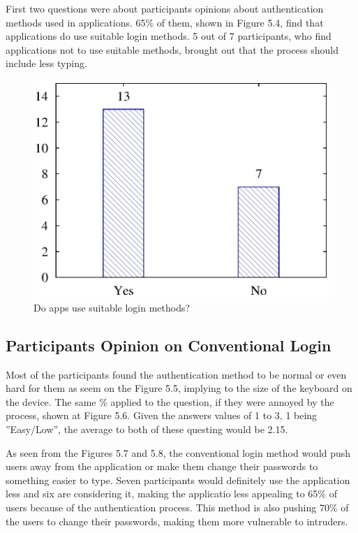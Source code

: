 First two questions were about participants opinions about authentication methods used in applications. 65\% of them, shown in Figure 5.4, find that applications do use suitable login methods. 5 out of 7 participants, who find applications not to use suitable methods, brought out that the process should include less typing. 

\begin{figure}[H]
\centering
\includegraphics[scale=.7]{files/question1/question1.eps}
\caption{Do apps use suitable login methods?}
\label{fig:digraph}
\end{figure}

\subsection{Participants Opinion on Conventional Login}
Most of the participants found the authentication method to be normal or even hard for them as seem on the Figure 5.5, implying to the size of the keyboard on the device. The same \% applied to the question, if they were annoyed by the process, shown at Figure 5.6. Given the answers values of 1 to 3, 1 being ''Easy/Low'', the average to both of these questing would be 2.15. 

As seen from the Figures 5.7 and 5.8, the conventional login method would push users away from the application or make them change their passwords to something easier to type. Seven participants would definitely use the application less and six are considering it, making the applicatio less appealing to 65\% of users because of the authentication process. This method is also pushing 70\% of the  users to change their passwords, making them more vulnerable to intruders.  

